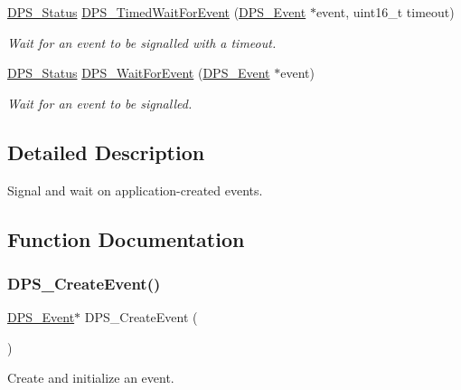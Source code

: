 \begin{DoxyCompactItemize}
\hyperlink{group__status_ga30395a84d3cad9d4ec29848106415038}{D\+P\+S\+\_\+\+Status} \hyperlink{group__event_gacf62ac4adc9f8eaf088cdec6c273e930}{D\+P\+S\+\_\+\+Timed\+Wait\+For\+Event} (\hyperlink{group__event_ga97617da1bac0e76646713b8665dfdd85}{D\+P\+S\+\_\+\+Event} $\ast$event, uint16\+\_\+t timeout)
\begin{DoxyCompactList}\small\item\em Wait for an event to be signalled with a timeout. \end{DoxyCompactList}\item 
\hyperlink{group__status_ga30395a84d3cad9d4ec29848106415038}{D\+P\+S\+\_\+\+Status} \hyperlink{group__event_gab2f3f1236cd100cd271c85191df650e8}{D\+P\+S\+\_\+\+Wait\+For\+Event} (\hyperlink{group__event_ga97617da1bac0e76646713b8665dfdd85}{D\+P\+S\+\_\+\+Event} $\ast$event)
\begin{DoxyCompactList}\small\item\em Wait for an event to be signalled. \end{DoxyCompactList}\end{DoxyCompactItemize}


\subsection{Detailed Description}
Signal and wait on application-\/created events. 



\subsection{Function Documentation}
\mbox{\label{group__event_gac38abc1e32666d631a40049c90bc66d3}} 
\subsubsection{\texorpdfstring{D\+P\+S\+\_\+\+Create\+Event()}{DPS\_CreateEvent()}}
{\footnotesize\ttfamily \hyperlink{group__event_ga97617da1bac0e76646713b8665dfdd85}{D\+P\+S\+\_\+\+Event}$\ast$ D\+P\+S\+\_\+\+Create\+Event (\begin{DoxyParamCaption}{ }\end{DoxyParamCaption})}



Create and initialize an event. 

